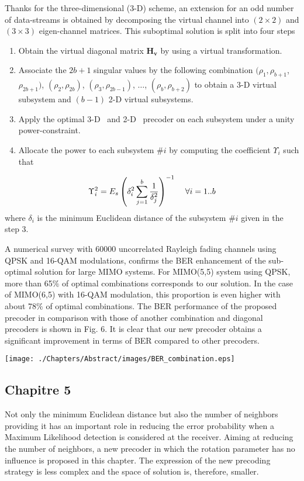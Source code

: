 Thanks for the three-dimensional (3-D) scheme, an extension for an odd number of data-streams is obtained by decomposing the virtual channel into $(2 \times 2)$ and $(3 \times 3)$ eigen-channel matrices. This suboptimal solution is split into four steps 
\begin{enumerate}
\item Obtain the virtual diagonal matrix $\mathbf{H_v}$ by using a virtual transformation.
\item Associate the $2b+1$ singular values by the following combination $(\rho_1, \rho_{b+1}$, $\rho_{2b+1})$, $(\rho_2,\rho_{2b})$, $(\rho_3,\rho_{2b-1})$, $\hdots$, $(\rho_{b},\rho_{b+2})$ to obtain a 3-D virtual subsystem and $(b-1)$ 2-D virtual subsystems. 
\item Apply the optimal 3-D \maxdmin\ and 2-D \maxdmin\ precoder on each subsystem under a unity power-constraint. 
\item Allocate the power to each subsystem $\#i$ by computing the coefficient $\Upsilon_i$ such that
\end{enumerate}
\begin{equation*}
	\Upsilon_i^2 = E_s \left( \delta^2_i \sum_{j=1}^b \frac{1}{\delta^2_j} \right)^{-1} \hspace{3mm} \; \forall i=1..b
\end{equation*}
where $\delta_i$ is the minimum Euclidean distance of the subsystem $\#i$ given in the step 3. 

A numerical survey with $60 000$ uncorrelated Rayleigh fading channels using QPSK and 16-QAM modulations, confirms the BER enhancement of the sub-optimal solution for large MIMO systems. For MIMO(5,5) system using QPSK, more than 65$\%$ of optimal combinations corresponds to our solution. In the case of MIMO(6,5) with 16-QAM modulation, this proportion is even higher with about 78$\%$ of optimal combinations. The BER performance of the proposed precoder in comparison with those of another combination and diagonal precoders is shown in Fig. 6. It is clear that our new precoder obtains a significant improvement in terms of BER compared to other precoders.
\begin{center} 
	\texttt{[image: ./Chapters/Abstract/images/BER\_combination.eps]}
\end{center}

\subsection*{Chapitre 5}
Not only the minimum Euclidean distance but also the number of neighbors providing it has an important role in reducing the error probability when a Maximum Likelihood detection is considered at the receiver. Aiming at reducing the number of neighbors, a new precoder in which the rotation parameter has no influence is proposed in this chapter. The expression of the new precoding strategy is less complex and the space of solution is, therefore, smaller.

